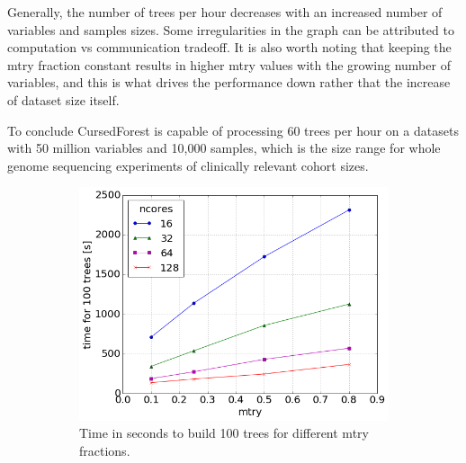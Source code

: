 \documentclass[a4paper]{amsart}
\begin{document}
Generally, the number of trees per hour decreases with an increased number of variables and samples sizes. Some
irregularities in the graph can be attributed to computation vs communication tradeoff. It is also worth noting that
keeping the mtry fraction constant results in higher mtry values with the growing number of variables, and this is
what drives the performance down rather that the increase of dataset size itself.

To conclude CursedForest is capable of processing 60 trees per hour on a datasets with 50 million variables and 10,000
samples, which is the size range for whole genome sequencing experiments of clinically relevant cohort sizes.

\begin{figure}[tbhp]
    \caption{\textbf{Scalability of the wide random forest on the synthetic dataset of 2.5M features and 5K samples.}}
    \label{figure:synthetictiming}
    \begin{subfigure}[b]{0.45\linewidth}
      \centering
      \includegraphics[totalheight=5cm]{../plos16/figs/mtry_cpu.png} 
      \caption{Time in seconds to build 100 trees for different mtry fractions. } 
      \label{figure:synthetictiming.a} 
      \vspace{4ex}
    \end{subfigure} 
    \hfill
    \begin{subfigure}[b]{0.45\linewidth}
      \centering

\end{subfigure}
\end{figure}
\end{document}
